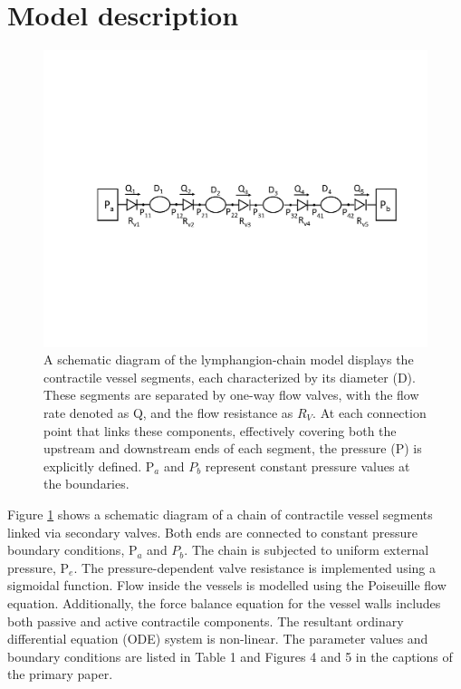 \documentclass[fleqn,10pt]{physiome}
\begin{document}
\section{Model description}
\begin{figure}
    \centering
    \includegraphics[trim=3.10cm 7.0cm 0.10cm 7.0cm, clip=true, totalheight=0.2\textheight,  ]{Lymphangion_model.pdf}
    \caption{A schematic diagram of the lymphangion-chain model displays the contractile vessel segments, each characterized by its diameter (D). These segments are separated by one-way flow valves, with the flow rate denoted as Q, and the flow resistance as $R_{V}$. At each connection point that links these components, effectively covering both the upstream and downstream ends of each segment, the pressure (P) is explicitly defined. P$_{a}$ and $P_{b}$ represent constant pressure values at the boundaries. }
    \label{fig:schematic}
\end{figure}

Figure \ref{fig:schematic} shows a schematic diagram of a chain of contractile vessel segments linked via secondary valves. Both ends are connected to constant pressure boundary conditions, P$_{a}$ and $P_{b}$. The chain is subjected to uniform external pressure, P$_{e}$. The pressure-dependent valve resistance is implemented using a sigmoidal function. Flow inside the vessels is modelled using the Poiseuille flow equation. Additionally, the force balance equation for the vessel walls includes both passive and active contractile components. The resultant ordinary differential equation (ODE) system is non-linear. The parameter values and boundary conditions are listed in Table 1 and Figures 4 and 5 in the captions of the primary paper. 
\end{document}
